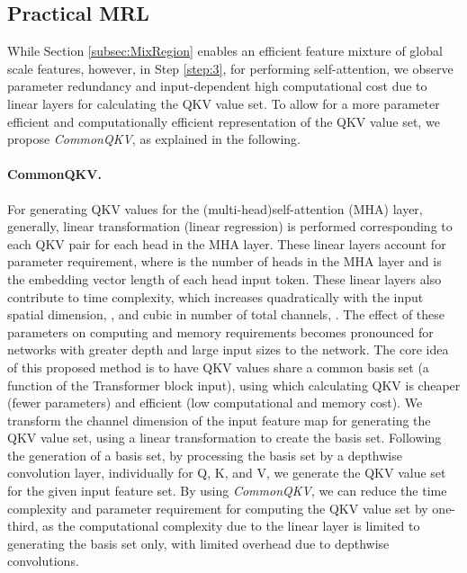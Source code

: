 \documentclass{article}
\begin{document}
\subsection{Practical MRL}\label{subsec:implement}
While Section \ref{subsec:MixRegion} enables an efficient feature mixture of global scale features, however, in Step \ref{step:3}, for performing self-attention, we observe parameter redundancy and input-dependent high computational cost due to linear layers for calculating the QKV value set. To allow for a more parameter efficient and computationally efficient representation of the QKV value set, we propose \textit{CommonQKV}, as explained in the following.

\paragraph{CommonQKV.} \label{CQ} For generating QKV values for the (multi-head)self-attention (MHA) layer, generally, linear transformation (linear regression) is performed corresponding to each QKV pair for each head in the MHA layer. These linear layers account for  parameter requirement, where  is the number of heads in the MHA layer and  is the embedding vector length of each head input token. These linear layers also contribute to  time complexity, which increases quadratically with the input spatial dimension, , and cubic in number of total channels, . The effect of these parameters on computing and memory requirements becomes pronounced for networks with greater depth and large input sizes to the network. The core idea of this proposed method is to have QKV values share a common basis set (a function of the Transformer block input), using which calculating QKV is cheaper (fewer parameters) and efficient (low computational and memory cost). We transform the channel dimension of the input feature map for generating the QKV value set, using a linear transformation to create the basis set. Following the generation of a basis set, by processing the basis set by a depthwise convolution layer, individually for Q, K, and V, we generate the QKV value set for the given input feature set. By using \textit{CommonQKV}, we can reduce the time complexity and parameter requirement for computing the QKV value set by one-third, as the computational complexity due to the linear layer is limited to generating the basis set only, with limited overhead due to depthwise convolutions. 
\end{document}
